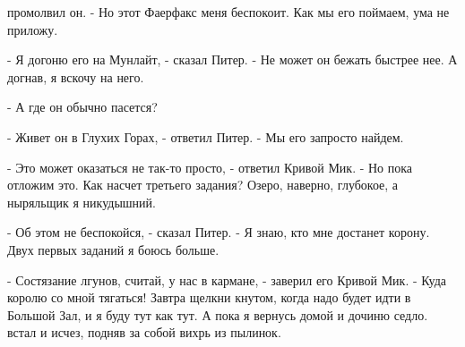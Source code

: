 промолвил он. - Но этот Фаерфакс меня беспокоит. Как мы его поймаем, 
ума не приложу.
\par- Я догоню его на Мунлайт, - сказал Питер. - Не может он бежать 
быстрее нее. А догнав, я вскочу на него.
\par- А где он обычно пасется?
\par- Живет он в Глухих Горах, - ответил Питер. - Мы его запросто 
найдем.
\par- Это может оказаться не так-то просто, - ответил Кривой Мик. - Но 
пока отложим это. Как насчет третьего задания? Озеро, наверно, 
глубокое, а ныряльщик я никудышний.
\par- Об этом не беспокойся, - сказал Питер. - Я знаю, кто мне 
достанет корону. Двух первых заданий я боюсь больше.
\par- Состязание лгунов, считай, у нас в кармане, - заверил его Кривой 
Мик. - Куда королю со мной тягаться! Завтра щелкни кнутом, когда надо 
будет идти в Большой Зал, и я буду тут как тут. А пока я вернусь домой 
и дочиню седло.
 встал и исчез, подняв за собой вихрь из пылинок.
